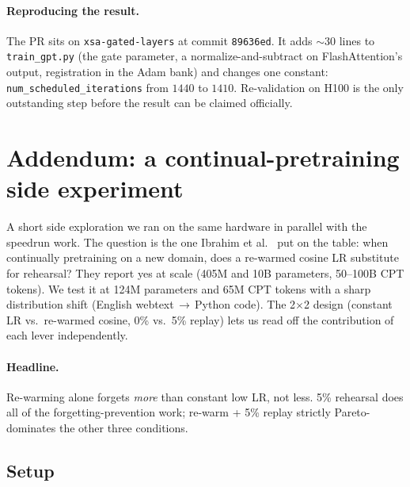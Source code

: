 \documentclass[10pt,letterpaper]{article}
\newcommand{\code}[1]{\texttt{\small #1}}
\begin{document}
\paragraph{Reproducing the result.} The PR sits on \code{xsa-gated-layers} at commit \code{89636ed}. It adds $\sim$30 lines to \code{train\_gpt.py} (the gate parameter, a normalize-and-subtract on FlashAttention's output, registration in the Adam bank) and changes one constant: \code{num\_scheduled\_iterations} from $1440$ to $1410$. Re-validation on H100 is the only outstanding step before the result can be claimed officially.

\section{Addendum: a continual-pretraining side experiment}
\label{sec:cpt}

A short side exploration we ran on the same hardware in parallel with the speedrun work. The question is the one Ibrahim et al.~\cite{ibrahim_cpt} put on the table: when continually pretraining on a new domain, does a re-warmed cosine LR substitute for rehearsal? They report yes at scale (405M and 10B parameters, 50--100B CPT tokens). We test it at 124M parameters and 65M CPT tokens with a sharp distribution shift (English webtext\,$\to$\,Python code). The 2$\times$2 design (constant LR vs.\ re-warmed cosine, 0\% vs.\ 5\% replay) lets us read off the contribution of each lever independently.

\paragraph{Headline.} Re-warming alone forgets \emph{more} than constant low LR, not less. 5\% rehearsal does all of the forgetting-prevention work; re-warm + 5\% replay strictly Pareto-dominates the other three conditions.

\subsection{Setup}
\label{sec:cpt-setup}
\end{document}

